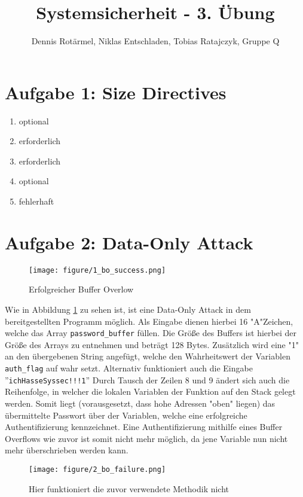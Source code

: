 \documentclass[]{scrreprt}
\title{Systemsicherheit - 3. Übung}
\author{Dennis Rotärmel, Niklas Entschladen, Tobias Ratajczyk, Gruppe Q}
\begin{document}
	\maketitle
	
	\newpage
	\thispagestyle{empty}
	\section*{Aufgabe 1: Size Directives}
	
	\renewcommand{\labelenumi}{\alph{enumi})}
	\begin{enumerate}
		\item optional
		\item erforderlich
		\item erforderlich
		\item optional
		\item fehlerhaft
	\end{enumerate}
	\section*{Aufgabe 2: Data-Only Attack}
	\begin{figure}[h]
		\centering\texttt{[image: figure/1\_bo\_success.png]}
		\caption{\label{fig:bosuccess}Erfolgreicher Buffer Overlow}
	\end{figure}
	Wie in Abbildung \ref{fig:bosuccess} zu sehen ist, ist eine Data-Only Attack in dem bereitgestellten Programm möglich. Als Eingabe dienen hierbei 16 "{}A"{}Zeichen, welche das Array \verb|password_buffer| füllen. Die Größe des Buffers ist hierbei der Größe des Arrays zu entnehmen und beträgt 128 Bytes. Zusätzlich wird eine "{}1"{} an den übergebenen String angefügt, welche den Wahrheitswert der Variablen \verb|auth_flag| auf wahr setzt. Alternativ funktioniert auch die Eingabe ''\texttt{ichHasseSyssec!!!1}'' \newline
	Durch Tausch der Zeilen 8 und 9 ändert sich auch die Reihenfolge, in welcher die lokalen Variablen der Funktion auf den Stack gelegt werden.
	Somit liegt (vorausgesetzt, dass hohe Adressen "oben" liegen) das übermittelte Passwort über der Variablen, welche eine erfolgreiche Authentifizierung kennzeichnet.
	Eine Authentifizierung mithilfe eines Buffer Overflows wie zuvor ist somit nicht mehr möglich, da jene Variable nun nicht mehr überschrieben werden kann. 
	\begin{figure}[h]
		\centering\texttt{[image: figure/2\_bo\_failure.png]}
		\caption{Hier funktioniert die zuvor verwendete Methodik nicht}
	\end{figure}
\end{document}
